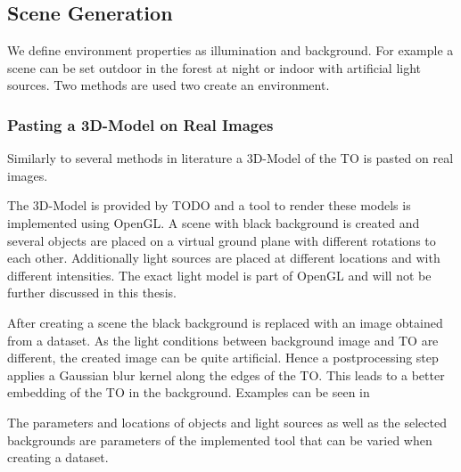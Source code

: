 \subsection{Scene Generation}
\label{sec:training:scene}
We define environment properties as illumination and background. For example a scene can be set outdoor in the forest at night or indoor with artificial light sources. Two methods are used two create an environment.

\subsubsection{Pasting a 3D-Model on Real Images}

Similarly to several methods in literature \cite{Girshick2013, Peng, Rozantsev} a 3D-Model of the \ac{TO} is pasted on real images.

The 3D-Model is provided by TODO and a tool to render these models is implemented using OpenGL. A scene with black background is created and several objects are placed on a virtual ground plane with different rotations to each other. Additionally light sources are placed at different locations and with different intensities. The exact light model is part of OpenGL and will not be further discussed in this thesis. 

After creating a scene the black background is replaced with an image obtained from a dataset. As the light conditions between background image and \ac{TO} are different, the created image can be quite artificial. Hence a postprocessing step applies a Gaussian blur kernel along the edges of the \ac{TO}. This leads to a better embedding of the \ac{TO} in the background.
Examples can be seen in 

The parameters and locations of objects and light sources as well as the selected backgrounds are parameters of the implemented tool that can be varied when creating a dataset.

